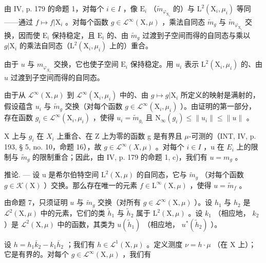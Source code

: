 由 IV, p. 179 的命题 1，对每个 \(i \in I\) ，像 \(\mathrm{E}_i\) （\(\widetilde{m}_{\varphi_{\mathrm{X}_i}}\) 的）与 \(\mathrm{L}^2(\mathrm{X}_i, \mu_i)\) 等同——通过 \(f \mapsto f|\mathrm{X}_i\) 。对每个函数 \(g \in \mathcal{L}^\infty(\mathrm{X}, \mu)\) ，乘法自同态 \(\widetilde{m}_g\) 与 \(\widetilde{m}_{\varphi_{\mathrm{X}_i}}\) 交换，因而使 \(\mathrm{E}_i\) 保持稳定，且 \(\mathrm{E}_i\) 的、由 \(\widetilde{m}_g\) 过渡到子空间而得的自同态与乘以 \(g|\mathrm{X}_i\) 的乘法自同态（\(\mathrm{L}^2(\mathrm{X}_i, \mu_i)\) 上的）重合。

由于 \(u\) 与 \(m_{\varphi_{X_i}}\) 交换，它也使子空间 \(\mathrm{E}_i\) 保持稳定。用 \(u_i\) 表示 \(\mathrm{L}^2 (\mathrm{X}_i,\mu_i)\) 的、由 \(u\) 过渡到子空间而得的自同态。

由于从 \(\mathcal{L}^{\infty}(\mathrm{X},\mu)\) 到 \(\mathcal{L}^{\infty}(\mathrm{X}_{i},\mu_{i})\) 中的、由 \(g\mapsto g|\mathrm{X}_{i}\) 所定义的映射是满射的，假设蕴含 \(u_{i}\) 与 \(\widetilde{m}_{g}\) 交换（对每个函数 \(g\in \mathcal{L}^{\infty}(\mathrm{X}_{i},\mu_{i})\) ）。由证明的第一部分，存在函数 \(g_{i}\in \mathcal{L}^{\infty}(\mathrm{X}_{i},\mu_{i})\) ，使得 \(u_{i} = \widetilde{m}_{g_{i}}\) 且 \(\mathrm{N}_{\infty}(g_{i})\leqslant \| u_{i}\| \leqslant \| u\|\) 。

X 上与 \(g_{i}\) 在 \(X_{i}\) 上重合、在 Z 上为零的函数 g 是有界且 \(\mu\)-可测的（INT, IV, p. 193, § 5, no. 10，命题 16），故 \(g \in \mathcal{L}^{\infty}(X, \mu)\) 。对每个 \(i \in I\) ，u 在 \(E_{i}\) 上的限制与 \(\tilde{m}_{g}\) 的限制重合；因此，由 IV, p. 179 的命题 1, c)，我们有 \(u = m_{g}\) 。

推论. --- 设 u 是希尔伯特空间 \(\mathrm{L}^{2}(\mathrm{X},\mu)\) 的自同态，它与 \(\widetilde{m}_{g}\) （对每个函数 \(g\in\mathcal{K}(\mathrm{X})\) ）交换。那么存在唯一的元素 \(f\in\mathrm{L}^{\infty}(\mathrm{X},\mu)\) ，使得 \(u=\widetilde{m}_{f}\) 。

由命题 7，只须证明 \(u\) 与 \(\widetilde{m}_{g}\) 交换（对所有 \(g\in\mathcal{L}^{\infty}(\mathrm{X},\mu)\) ）。设 \(h_{1}\) 与 \(h_{2}\) 是 \(\mathcal{L}^{2}(\mathrm{X},\mu)\) 中的元素，它们的类 \(\widetilde{h}_{1}\) 与 \(\widetilde{h}_{2}\) 属于 \(\mathrm{L}^{2}(\mathrm{X},\mu)\) 。设 \(k_{1}\) （相应地， \(k_{2}\) ）是 \(\mathcal{L}^{2}(\mathrm{X},\mu)\) 中的函数，其类为 \(u(\widetilde{h}_{1})\) （相应地， \(u^{*}(\widetilde{h}_{2})\) ）。

设 \(h = h_1 \overline{k}_2 - k_1 \overline{h}_2\) ；我们有 \(h \in \mathcal{L}^1(\mathrm{X}, \mu)\) 。定义测度 \(\nu = h \cdot \mu\) （在 \(\mathrm{X}\) 上）；它是有界的。对每个 \(g \in \mathcal{L}^\infty(\mathrm{X}, \mu)\) ，我们有

